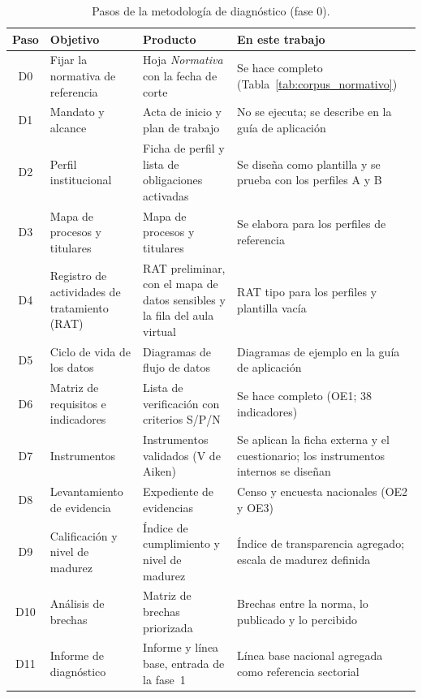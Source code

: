 \begin{table}[htbp]
  \centering
  \caption{Pasos de la metodología de diagnóstico (fase 0).}
  \label{tab:pasos_diagnostico}
  \scriptsize
  \renewcommand{\arraystretch}{1.12}
  \begin{tabularx}{\textwidth}{|c|>{\raggedright\arraybackslash}p{3.0cm}|>{\raggedright\arraybackslash}p{3.4cm}|L|}
    \hline
    \textbf{Paso} & \textbf{Objetivo} & \textbf{Producto} & \textbf{En este trabajo} \\
    \hline
    D0 & Fijar la normativa de referencia & Hoja \textit{Normativa} con la fecha de corte & Se hace completo (Tabla~\ref{tab:corpus_normativo}) \\ \hline
    D1 & Mandato y alcance & Acta de inicio y plan de trabajo & No se ejecuta; se describe en la guía de aplicación \\ \hline
    D2 & Perfil institucional & Ficha de perfil y lista de obligaciones activadas & Se diseña como plantilla y se prueba con los perfiles A y B \\ \hline
    D3 & Mapa de procesos y titulares & Mapa de procesos y titulares & Se elabora para los perfiles de referencia \\ \hline
    D4 & Registro de actividades de tratamiento (RAT) & RAT preliminar, con el mapa de datos sensibles y la fila del aula virtual & RAT tipo para los perfiles y plantilla vacía \\ \hline
    D5 & Ciclo de vida de los datos & Diagramas de flujo de datos & Diagramas de ejemplo en la guía de aplicación \\ \hline
    D6 & Matriz de requisitos e indicadores & Lista de verificación con criterios S/P/N & Se hace completo (OE1; 38 indicadores) \\ \hline
    D7 & Instrumentos & Instrumentos validados (V de Aiken) & Se aplican la ficha externa y el cuestionario; los instrumentos internos se diseñan \\ \hline
    D8 & Levantamiento de evidencia & Expediente de evidencias & Censo y encuesta nacionales (OE2 y OE3) \\ \hline
    D9 & Calificación y nivel de madurez & Índice de cumplimiento y nivel de madurez & Índice de transparencia agregado; escala de madurez definida \\ \hline
    D10 & Análisis de brechas & Matriz de brechas priorizada & Brechas entre la norma, lo publicado y lo percibido \\ \hline
    D11 & Informe de diagnóstico & Informe y línea base, entrada de la fase~1 & Línea base nacional agregada como referencia sectorial \\ \hline
  \end{tabularx}
  \raggedright
\end{table}

